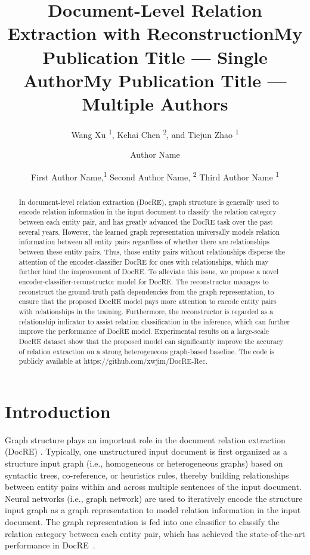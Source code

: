 \documentclass[letterpaper]{article} \usepackage{aaai21}  \usepackage{times}  \usepackage{helvet} \usepackage{courier}  \usepackage[hyphens]{url}  \usepackage{graphicx} \urlstyle{rm} \def\UrlFont{\rm}  \usepackage{natbib}  \usepackage{caption} \frenchspacing  \setlength{\pdfpagewidth}{8.5in}  \setlength{\pdfpageheight}{11in}  \usepackage{amsmath}
\title{Document-Level Relation Extraction with Reconstruction}
\author{
Wang Xu \textsuperscript{\rm 1},
    Kehai Chen \textsuperscript{\rm 2},
    and Tiejun Zhao \textsuperscript{\rm {1}}
}
\title{My Publication Title --- Single Author}
\author {
Author Name \\
}
\title{My Publication Title --- Multiple Authors}
\author {


        First Author Name,\textsuperscript{\rm 1}
        Second Author Name, \textsuperscript{\rm 2}
        Third Author Name \textsuperscript{\rm 1} \\
}
\begin{document}
\maketitle

\begin{abstract}
In document-level relation extraction (DocRE), graph structure is generally used to encode relation information in the input document to classify the relation category between each entity pair, and has greatly advanced the DocRE task over the past several years.
However, the learned graph representation universally models relation information between all entity pairs regardless of whether there are relationships between these entity pairs.
Thus, those entity pairs without relationships disperse the attention of the encoder-classifier DocRE for ones with relationships, which may further hind the improvement of DocRE.
To alleviate this issue, we propose a novel encoder-classifier-reconstructor model for DocRE.
The reconstructor manages to reconstruct the ground-truth path dependencies from the graph representation, to ensure that the proposed DocRE model pays more attention to encode entity pairs with relationships in the training.
Furthermore, the reconstructor is regarded as a relationship indicator to assist relation classification in the inference, which can further improve the performance of DocRE model.
Experimental results on a large-scale DocRE dataset show that the proposed model can significantly improve the accuracy of relation extraction on a strong heterogeneous graph-based baseline.
The code is publicly available at {https://github.com/xwjim/DocRE-Rec}.
\end{abstract}

\section{Introduction}
Graph structure plays an important role in the document relation extraction (DocRE) \cite{Christopoulou2019ConnectingTD,sahu-etal-2019-inter,Nan2020ReasoningWL,Tang2020HINHI}.
Typically, one unstructured input document is first organized as a structure input graph (i.e., homogeneous or heterogeneous graphs) based on syntactic trees, co-reference, or heuristics rules, thereby building relationships between entity pairs within and across multiple sentences of the input document.
Neural networks (i.e., graph network) are used to iteratively encode the structure input graph as a graph representation to model relation information in the input document.
The graph representation is fed into one classifier to classify the relation category between each entity pair, which has achieved the state-of-the-art performance in DocRE~\cite{Christopoulou2019ConnectingTD,Nan2020ReasoningWL}.
\end{document}
